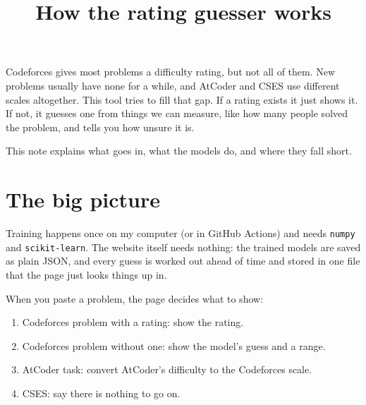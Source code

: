 \documentclass[11pt,a4paper]{article}
\title{How the rating guesser works}
\author{}
\date{}
\begin{document}
\maketitle

Codeforces gives most problems a difficulty rating, but not all of them. New problems usually have none for a while, and AtCoder and CSES use different scales altogether. This tool tries to fill that gap. If a rating exists it just shows it. If not, it guesses one from things we can measure, like how many people solved the problem, and tells you how unsure it is.

This note explains what goes in, what the models do, and where they fall short.

\section{The big picture}

Training happens once on my computer (or in GitHub Actions) and needs \texttt{numpy} and \texttt{scikit-learn}. The website itself needs nothing: the trained models are saved as plain JSON, and every guess is worked out ahead of time and stored in one file that the page just looks things up in.

\begin{center}
\end{center}

When you paste a problem, the page decides what to show:
\begin{enumerate}[nosep]
\item Codeforces problem with a rating: show the rating.
\item Codeforces problem without one: show the model's guess and a range.
\item AtCoder task: convert AtCoder's difficulty to the Codeforces scale.
\item CSES: say there is nothing to go on.
\end{enumerate}
\end{document}
